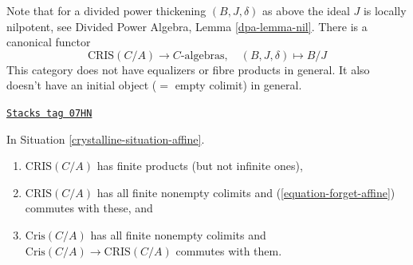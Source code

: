 Note that for a divided power thickening $(B, J, \delta)$ as above
the ideal $J$ is locally nilpotent, see
Divided Power Algebra, Lemma \ref{dpa-lemma-nil}.
There is a canonical functor
\begin{equation}
\label{equation-forget-affine}
\text{CRIS}(C/A) \longrightarrow C\text{-algebras},\quad
(B, J, \delta) \longmapsto B/J
\end{equation}
This category does not have equalizers or fibre products in general.
It also doesn't have an initial object ($=$ empty colimit) in general.

\begin{lemma}
\label{crystalline-lemma-affine-thickenings-colimits}
\href{https://stacks.math.columbia.edu/tag/07HN}{\texttt{Stacks tag 07HN}}

In Situation \ref{crystalline-situation-affine}.
\begin{enumerate}
\item $\text{CRIS}(C/A)$ has finite products (but not infinite ones),
\item $\text{CRIS}(C/A)$ has all finite nonempty colimits and
(\ref{equation-forget-affine}) commutes with these, and
\item $\text{Cris}(C/A)$ has all finite nonempty colimits and
$\text{Cris}(C/A) \to \text{CRIS}(C/A)$ commutes with them.
\end{enumerate}
\end{lemma}

